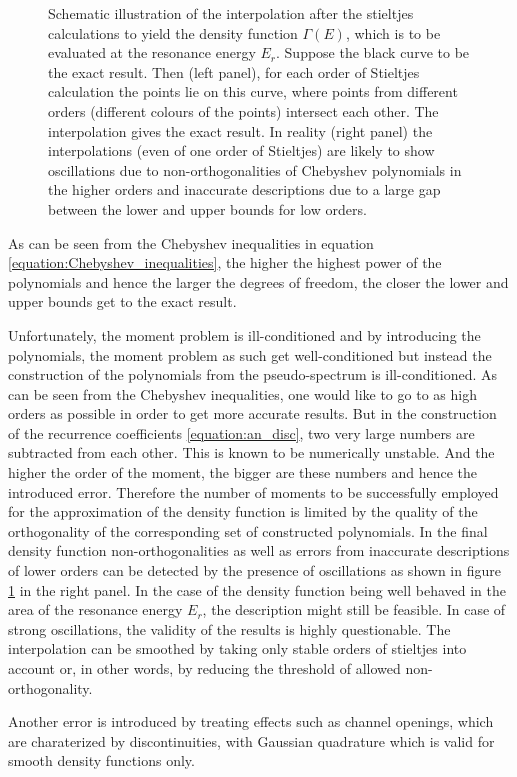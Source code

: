 \begin{figure}[h]
  \centering
  
  \caption{Schematic illustration of the interpolation after the
           stieltjes calculations to yield the density function $\Gamma(E)$,
           which is to be evaluated at the resonance energy $E_r$.
           Suppose the black curve to be the
           exact result. Then (left panel), for each order of Stieltjes calculation
           the points lie on this curve, where points from different orders
           (different colours of the points) intersect each other. The interpolation
           gives the exact result. In reality (right panel) the
           interpolations (even of one order of Stieltjes)
           are likely to show oscillations due to non-orthogonalities of
           Chebyshev polynomials in the higher orders and inaccurate descriptions
           due to a large gap between the lower and upper bounds for low
           orders.}
  \label{figure:stieltjes_density}
\end{figure}

As can be seen from the Chebyshev inequalities in
equation \ref{equation:Chebyshev_inequalities}, the higher the highest
power of the polynomials and hence the larger the degrees of freedom,
the closer the lower and upper bounds get to the exact result.

Unfortunately, the moment problem is ill-conditioned and by introducing
the polynomials, the moment problem as such get well-conditioned but instead
the construction of the polynomials from the pseudo-spectrum is ill-conditioned.
As can be seen from the Chebyshev inequalities, one would like to go to as
high orders as possible in order to get more accurate results. But in the construction
of the recurrence coefficients \ref{equation:an_disc}, two very large numbers
are subtracted from each other. This is known to be numerically unstable.
And the higher the order of the moment, the bigger
are these numbers and hence the introduced error. Therefore the number
of moments to be successfully employed for the approximation of the
density function is limited by the quality of the orthogonality of
the corresponding set of constructed polynomials. In the final density function
non-orthogonalities as well as errors from inaccurate descriptions of lower
orders can be detected by the presence of oscillations as shown in
figure \ref{figure:stieltjes_density} in the right panel. In the case of the density
function being well behaved in the area of the resonance energy $E_r$, the
description might still be feasible. In case of strong oscillations, the validity
of the results is highly questionable. The interpolation can be smoothed
by taking only stable orders of stieltjes into account or, in other words,
by reducing the threshold of allowed non-orthogonality.

Another error is introduced by treating effects such as channel openings, which
are charaterized by discontinuities, with Gaussian quadrature which is valid
for smooth density functions only. 
